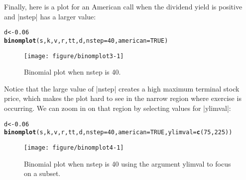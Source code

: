 \documentclass{article}\usepackage[]{graphicx}\usepackage[]{color}
\makeatletter
\newcommand{\hlnum}[1]{\textcolor[rgb]{0.686,0.059,0.569}{#1}}%
\newcommand{\hlstd}[1]{\textcolor[rgb]{0.345,0.345,0.345}{#1}}%
\newcommand{\hlkwb}[1]{\textcolor[rgb]{0.69,0.353,0.396}{#1}}%
\newcommand{\hlkwc}[1]{\textcolor[rgb]{0.333,0.667,0.333}{#1}}%
\newcommand{\hlkwd}[1]{\textcolor[rgb]{0.737,0.353,0.396}{\textbf{#1}}}%
\newenvironment{kframe}{%
 \def\at@end@of@kframe{}%
 \ifinner\ifhmode%
  \def\at@end@of@kframe{\end{minipage}}%
  \begin{minipage}{\columnwidth}%
 \fi\fi%
 \def\FrameCommand##1{\hskip\@totalleftmargin \hskip-\fboxsep
 \colorbox{shadecolor}{##1}\hskip-\fboxsep
     \hskip-\linewidth \hskip-\@totalleftmargin \hskip\columnwidth}%
 \MakeFramed {\advance\hsize-\width
   \@totalleftmargin\z@ \linewidth\hsize
   \@setminipage}}%
 {\par\unskip\endMakeFramed%
 \at@end@of@kframe}
\newenvironment{knitrout}{}{} %
\makeatother
\begin{document}
Finally, here is a plot for an American call when the dividend yield
is positive and |nstep| has a larger value:

\begin{knitrout}\footnotesize
{}\color{fgcolor}\begin{kframe}
\begin{alltt}
\hlstd{d} \hlkwb{<-} \hlnum{0.06}
\hlkwd{binomplot}\hlstd{(s, k, v, r, tt, d,} \hlkwc{nstep}\hlstd{=}\hlnum{40}\hlstd{,} \hlkwc{american}\hlstd{=}\hlnum{TRUE}\hlstd{)}
\end{alltt}
\end{kframe}\begin{figure}

{\centering \texttt{[image: figure/binomplot3-1]} 

}

\caption{Binomial plot when nstep is 40.\label{fig:binomplot3}}\label{fig:binomplot3}
\end{figure}


\end{knitrout}

Notice that the large value of |nstep| creates a high maximum terminal
stock price, which makes the plot hard to see in the narrow region where
exercise is occurring. We can zoom in on that region by  selecting values for |ylimval|:

\begin{knitrout}\footnotesize
{}\color{fgcolor}\begin{kframe}
\begin{alltt}
\hlstd{d} \hlkwb{<-} \hlnum{0.06}
\hlkwd{binomplot}\hlstd{(s, k, v, r, tt, d,} \hlkwc{nstep}\hlstd{=}\hlnum{40}\hlstd{,} \hlkwc{american}\hlstd{=}\hlnum{TRUE}\hlstd{,} \hlkwc{ylimval}\hlstd{=}\hlkwd{c}\hlstd{(}\hlnum{75}\hlstd{,} \hlnum{225}\hlstd{))}
\end{alltt}
\end{kframe}\begin{figure}

{\centering \texttt{[image: figure/binomplot4-1]} 

}

\caption{Binomial plot when nstep is 40 using the argument ylimval to focus on a subset.\label{fig:binomplot4}}\label{fig:binomplot4}
\end{figure}


\end{knitrout}
\end{document}
